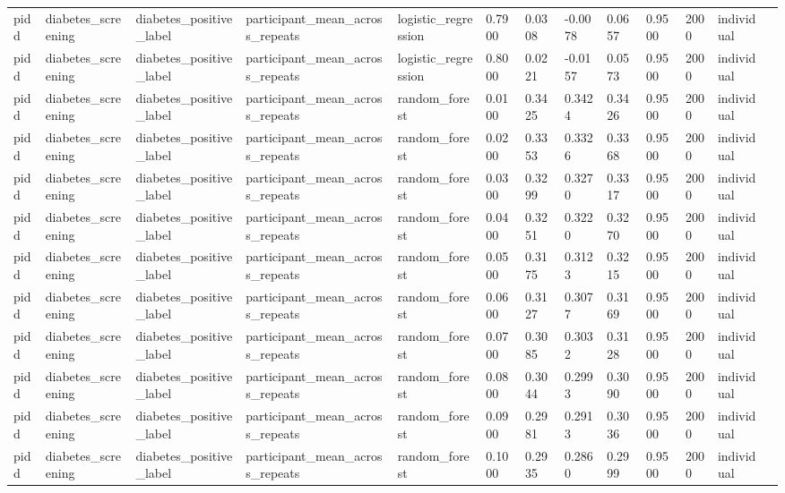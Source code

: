 \begin{tabular}{lllllllllllll}
pidd & diabetes\_screening & diabetes\_positive\_label & participant\_mean\_across\_repeats & logistic\_regression & 0.7900 & 0.0308 & -0.0078 & 0.0657 & 0.9500 & 2000 & individual &  \\
pidd & diabetes\_screening & diabetes\_positive\_label & participant\_mean\_across\_repeats & logistic\_regression & 0.8000 & 0.0221 & -0.0157 & 0.0573 & 0.9500 & 2000 & individual &  \\
pidd & diabetes\_screening & diabetes\_positive\_label & participant\_mean\_across\_repeats & random\_forest & 0.0100 & 0.3425 & 0.3424 & 0.3426 & 0.9500 & 2000 & individual &  \\
pidd & diabetes\_screening & diabetes\_positive\_label & participant\_mean\_across\_repeats & random\_forest & 0.0200 & 0.3353 & 0.3326 & 0.3368 & 0.9500 & 2000 & individual &  \\
pidd & diabetes\_screening & diabetes\_positive\_label & participant\_mean\_across\_repeats & random\_forest & 0.0300 & 0.3299 & 0.3270 & 0.3317 & 0.9500 & 2000 & individual &  \\
pidd & diabetes\_screening & diabetes\_positive\_label & participant\_mean\_across\_repeats & random\_forest & 0.0400 & 0.3251 & 0.3220 & 0.3270 & 0.9500 & 2000 & individual &  \\
pidd & diabetes\_screening & diabetes\_positive\_label & participant\_mean\_across\_repeats & random\_forest & 0.0500 & 0.3175 & 0.3123 & 0.3215 & 0.9500 & 2000 & individual &  \\
pidd & diabetes\_screening & diabetes\_positive\_label & participant\_mean\_across\_repeats & random\_forest & 0.0600 & 0.3127 & 0.3077 & 0.3169 & 0.9500 & 2000 & individual &  \\
pidd & diabetes\_screening & diabetes\_positive\_label & participant\_mean\_across\_repeats & random\_forest & 0.0700 & 0.3085 & 0.3032 & 0.3128 & 0.9500 & 2000 & individual &  \\
pidd & diabetes\_screening & diabetes\_positive\_label & participant\_mean\_across\_repeats & random\_forest & 0.0800 & 0.3044 & 0.2993 & 0.3090 & 0.9500 & 2000 & individual &  \\
pidd & diabetes\_screening & diabetes\_positive\_label & participant\_mean\_across\_repeats & random\_forest & 0.0900 & 0.2981 & 0.2913 & 0.3036 & 0.9500 & 2000 & individual &  \\
pidd & diabetes\_screening & diabetes\_positive\_label & participant\_mean\_across\_repeats & random\_forest & 0.1000 & 0.2935 & 0.2860 & 0.2999 & 0.9500 & 2000 & individual &  \\

\end{tabular}
